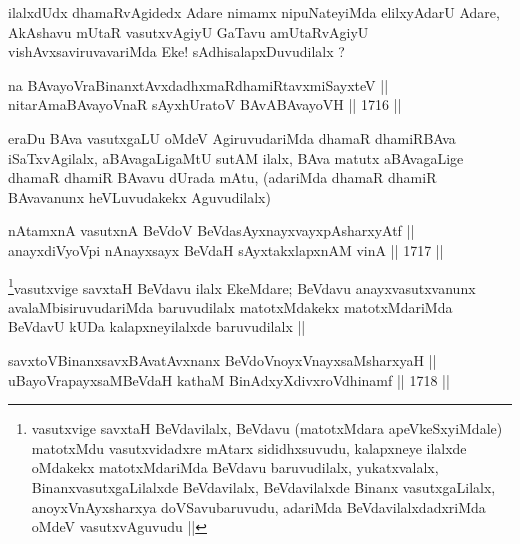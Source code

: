 \begin{artha}
ilalxdUdx dhamaRvAgidedx Adare nimamx nipuNateyiMda elilxyAdarU Adare,
AkAshavu mUtaR vasutxvAgiyU GaTavu amUtaRvAgiyU vishAvxsaviruvavariMda
Eke! sAdhisalapxDuvudilalx ?
\end{artha}


\begin{shl}
na BAvayoVraBinanxtAvxdadhxmaRdhamiRtavxmiSayxteV ||  \\
nitarAmaBAvayoVnaR sAyxhUratoV BAvABAvayoVH ||  1716 ||  
\end{shl}

\begin{artha}
eraDu BAva vasutxgaLU oMdeV AgiruvudariMda dhamaR dhamiRBAva
iSaTxvAgilalx, aBAvagaLigaMtU sutAM ilalx, BAva matutx aBAvagaLige
dhamaR dhamiR BAvavu dUrada mAtu, (adariMda dhamaR dhamiR BAvavanunx
heVLuvudakekx Aguvudilalx)
\end{artha}

\begin{shl}
nA\s \s tamxnA vasutxnA BeVdoV BeVdasAyxnayxvayxpAsharxyAtf || \\
anayxdiVyoV\s pi nAnayxsayx BeVdaH sAyxtakxlapxnAM vinA ||  1717 ||  
\end{shl}

\begin{artha}
\footnote[1]{vasutxvige savxtaH BeVdavilalx, BeVdavu (matotxMdara
  apeVkeSxyiMdale) matotxMdu vasutxvidadxre mAtarx sididhxsuvudu,
  kalapxneye ilalxde oMdakekx matotxMdariMda BeVdavu baruvudilalx,
  yukatxvalalx, BinanxvasutxgaLilalxde BeVdavilalx, BeVdavilalxde
  Binanx vasutxgaLilalx, anoyxVnAyxsharxya doVSavubaruvudu, adariMda
  BeVdavilalxdadxriMda oMdeV vasutxvAguvudu ||}vasutxvige savxtaH BeVdavu ilalx EkeMdare; BeVdavu
anayxvasutxvanunx avalaMbisiruvudariMda baruvudilalx matotxMdakekx
matotxMdariMda BeVdavU kUDa kalapxneyilalxde baruvudilalx ||
\end{artha}


\begin{shl}
savxtoV\s BinanxsavxBAvatAvxnanx BeVdoV\s noyxVnayxsaMsharxyaH || \\
uBayoVrapayxsaMBeVdaH kathaM BinAdxyXdivxroVdhinamf ||  1718 ||  
\end{shl}

